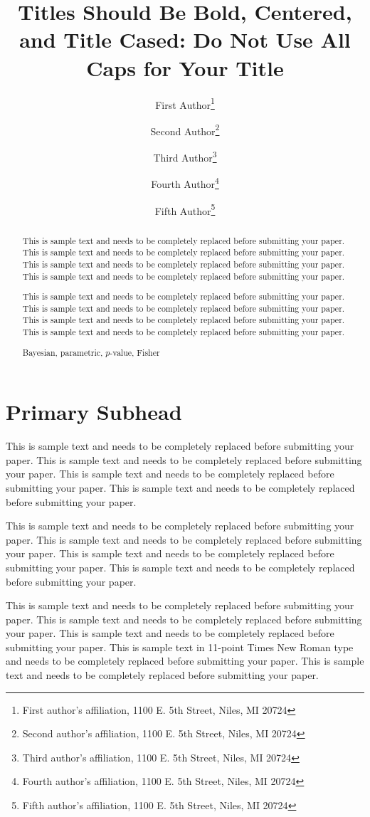 \documentclass[11pt]{asaproc}
\title{ Titles Should Be Bold, Centered, and Title Cased: Do Not
Use All Caps for Your Title}
\author{First Author\thanks{First author's affiliation, 1100 E. 5th Street, Niles, MI 20724} \and  Second Author\thanks{Second author's affiliation, 1100 E. 5th Street, Niles, MI 20724} \and  Third Author\thanks{Third author's affiliation,  1100 E. 5th Street, Niles, MI 20724} \and Fourth Author\thanks{Fourth author's affiliation,  1100 E. 5th Street, Niles, MI 20724} \and Fifth Author\thanks{Fifth author's affiliation,  1100 E. 5th Street, Niles, MI 20724}}
\begin{document}
\maketitle

\begin{abstract}
This is sample text and needs to be completely replaced before submitting your paper. This is sample text and needs to be completely replaced before submitting your paper. This is sample text and needs to be completely replaced before submitting your paper. This is sample text and needs to be completely replaced before submitting your paper.

This is sample text and needs to be completely replaced before submitting your paper. This is sample text and needs to be completely replaced before submitting your paper.  This is sample text and needs to be completely replaced before submitting your paper. This is sample text and needs to be completely replaced before submitting your paper.
\begin{keywords}
Bayesian, parametric, $p$-value, Fisher
\end{keywords}
\end{abstract}



\section{Primary Subhead\label{intro}}

This is sample text and needs to be completely replaced before submitting your paper. This is sample text and needs to be completely replaced before submitting your paper. This is sample text and needs to be completely replaced before submitting your paper. This is sample text and needs to be completely replaced before submitting your paper.

This is sample text and needs to be completely replaced before submitting your paper. This is sample text and needs to be completely replaced before submitting your paper.  This is sample text and needs to be completely replaced before submitting your paper. This is sample text and needs to be completely replaced before submitting your paper.

This is sample text and needs to be completely replaced before submitting your paper. This is sample text and needs to be completely replaced before submitting your paper. This is sample text and needs to be completely replaced before submitting your paper. This is sample text in 11-point Times New Roman type and needs to be completely replaced before submitting your paper. This is sample text and needs to be completely replaced before submitting your paper.
\end{document}
